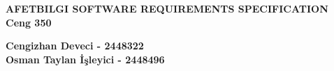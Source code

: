\documentclass{scrreprt}
\begin{document}
\begin{center}
    {\bfseries
        \Huge{AFETBILGI SOFTWARE REQUIREMENTS SPECIFICATION}\\
        \vspace{1.6cm}
        Ceng 350\\
        \vspace{3.6cm}
    }
\end{center}

\begin{flushleft}
    {\bfseries
        \large{Cengizhan Deveci - 2448322}\\
        \vspace{0.25cm}
        \large{Osman Taylan İşleyici - 2448496}\\
    }
\end{flushleft}

\tableofcontents
\listoffigures
\listoftables





\end{document}
